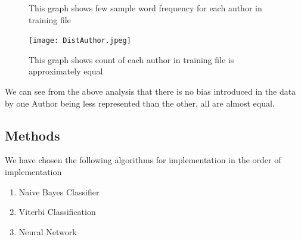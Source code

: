 \documentclass[fleqn,10pt]{SelfArx} %
\begin{document}
\begin{itemize}[noitemsep]
\begin{figure}[H]
	\caption{This graph shows few sample word frequency for each author in training file}
	\label{fig:Word frequency Author}
\end{figure}

\begin{figure}[H]\centering
	\texttt{[image: DistAuthor.jpeg]}
	\caption{This graph shows count of each author in training file is approximately equal}
	\label{fig: Author count in training file}
\end{figure}
We can see from the above analysis that there is no bias introduced in the data by one Author being less represented than the other, all are almost equal.\\
\end{itemize}



\subsection{Methods}
We have chosen the following algorithms for implementation in the order of implementation
\begin{enumerate}
	\item Naive Bayes Classifier
	\item Viterbi Classification
	\item Neural Network
\end{enumerate}
\end{document}
